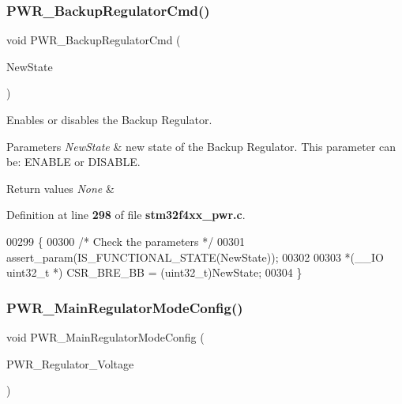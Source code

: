 \subsubsection{P\+W\+R\+\_\+\+Backup\+Regulator\+Cmd()}
{\footnotesize\ttfamily void P\+W\+R\+\_\+\+Backup\+Regulator\+Cmd (\begin{DoxyParamCaption}\item[{\textbf{ Functional\+State}}]{New\+State }\end{DoxyParamCaption})}



Enables or disables the Backup Regulator. 


\begin{DoxyParams}{Parameters}
{\em New\+State} & new state of the Backup Regulator. This parameter can be\+: E\+N\+A\+B\+LE or D\+I\+S\+A\+B\+LE. \\
\hline
\end{DoxyParams}

\begin{DoxyRetVals}{Return values}
{\em None} & \\
\hline
\end{DoxyRetVals}


Definition at line \textbf{ 298} of file \textbf{ stm32f4xx\+\_\+pwr.\+c}.


\begin{DoxyCode}
00299 \{
00300   \textcolor{comment}{/* Check the parameters */}
00301   assert_param(IS_FUNCTIONAL_STATE(NewState));
00302 
00303   *(\_\_IO uint32\_t *) CSR_BRE_BB = (uint32\_t)NewState;
00304 \}
\end{DoxyCode}
\mbox{\label{group__PWR__Group4_gada193dea79762f379d4e666a98f28d89}} 
\subsubsection{P\+W\+R\+\_\+\+Main\+Regulator\+Mode\+Config()}
{\footnotesize\ttfamily void P\+W\+R\+\_\+\+Main\+Regulator\+Mode\+Config (\begin{DoxyParamCaption}\item[{uint32\+\_\+t}]{P\+W\+R\+\_\+\+Regulator\+\_\+\+Voltage }\end{DoxyParamCaption})}




